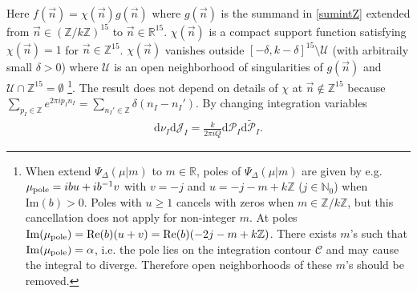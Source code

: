 \documentclass[aps,prd,notitlepage,nofootinbib,superscriptaddress,groupedaddress,twocolumn]{revtex4-1}
\def\R{\mathbb{R}}
\newcommand{\Slc}{\mathrm{SL}(2,\mathbb{C})}
\def\be{\begin{eqnarray}}
\def\ee{\end{eqnarray}}
\newcommand{\cc}{\mathcal C}
\newcommand{\cj}{\mathcal J}
\newcommand{\cu}{\mathcal U}
\newcommand{\cz}{\mathcal Z}
\newcommand{\scrp}{\mathscr{P}}
\newcommand{\scrq}{\mathscr{Q}}
\newcommand{\G}{\Gamma}
\newcommand{\rmd}{\mathrm d}
\begin{document}
Here $f(\vec{n})=\chi(\vec{n})g(\vec{n})$ where $g(\vec{n})$ is the summand in \eqref{sumintZ} extended from $\vec{n}\in(\mathbb{Z}/k\mathbb{Z})^{15} $ to $\vec{n}\in\R^{15} $. $\chi(\vec{n})$ is a compact support function satisfying $\chi(\vec{n})=1$ for $\vec{n}\in\mathbb{Z}^{15}$. $\chi(\vec{n})$ vanishes outside $[-\delta,k-\delta]^{15}\setminus \cu$ (with arbitraily small $\delta>0$) where $\cu$ is an open neighborhood of singularities of $g(\vec{n})$ and $\cu\cap \mathbb{Z}^{15}=\emptyset$ \footnote{When extend $\Psi_\Delta (\mu|m)$ to $m\in\R$, poles of $\Psi_\Delta (\mu|m)$ are given by e.g. $\mu_{\rm pole}=ib u+ib^{-1} v$ with $v=-j$ and $u=-j-m+k\mathbb{Z}$ ($j\in\mathbb{N}_0$) when $\mathrm{Im}(b)>0$. Poles with $u\geq 1$ cancels with zeros when $m\in\mathbb{Z}/k\mathbb{Z}$, but this cancellation does not apply for non-integer $m$. At poles $\mathrm{Im}(\mu_{\rm pole})=\mathrm{Re}(b)(u+v)=\mathrm{Re}(b)(-2j-m+k\mathbb{Z})$. There exists $m$'s such that $\mathrm{Im}(\mu_{\rm pole})=\alpha$, i.e. the pole lies on the integration contour $\cc$ and may cause the integral to diverge. Therefore open neighborhoods of these $m$'s should be removed.}. The result does not depend on details of $\chi$ at $\vec{n}\not\in \mathbb{Z}^{15}$ because $\sum_{p_I\in\mathbb{Z}}e^{2\pi i p_In_I}=\sum_{n_I'\in\mathbb{Z}}\delta(n_I-n_I')$. By changing integration variables%
\be
\rmd \nu_I\rmd\cj_I=\frac{k}{2\pi iQ}\rmd \scrp_I\rmd \widetilde{\scrp}_{I}.
\ee



\end{document}
